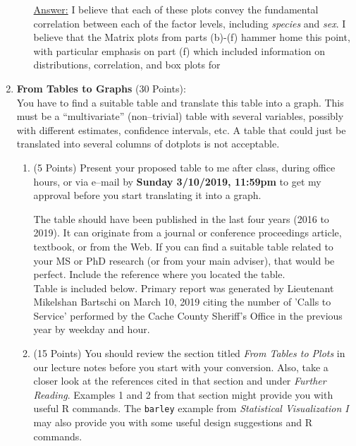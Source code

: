\documentclass[12pt,letterpaper,final]{article}
\begin{document}
\begin{enumerate}
\begin{enumerate}
\underline{Answer:}
{\scriptsize
I believe that each of these plots convey the fundamental correlation between each of the factor levels, including {\it species} and {\it sex}.  I believe that the Matrix plots from parts (b)-(f) hammer home this point, with particular emphasis on part (f) which included information on distributions, correlation, and box plots for
}
\end{enumerate}


\newpage


\item {\bf From Tables to Graphs} (30 Points): \\
You have to 
find a suitable table and translate this table into a graph.
This must be a ``multivariate'' (non--trivial) table with several variables,
possibly with different estimates, confidence intervals, etc. 
A table that could just be translated into several columns of dotplots is not acceptable. \\



\begin{enumerate}
\item (5 Points)
Present your proposed table to me after class, during office hours, or
via e--mail by {\bf Sunday 3/10/2019, 11:59pm}
to get my approval before you start translating it into a graph.

The table should have been published in the last four years (2016 to 2019).
It can originate from a journal or conference proceedings article, textbook, or from the Web.
If you can find a suitable table related to your MS or PhD research
(or from your main adviser), that would be perfect.
Include the reference where you located the table.\\

Table is included below.  Primary report was generated by Lieutenant Mikelshan Bartschi on March 10, 2019 citing the number of 'Calls to Service' performed by the Cache County Sheriff's Office in the previous year by weekday and hour.

\item (15 Points)
You should review the section titled {\it From Tables to Plots} 
in our lecture notes before you start with your conversion.
Also, take a closer look at the references cited in that section and under {\it Further Reading}.
Examples 1 and 2 from that section might provide you with useful R commands.
The {\tt barley} example from {\it Statistical Visualization I}
may also provide you with some useful design suggestions and R commands.


\end{enumerate}
\end{enumerate}
\end{document}
